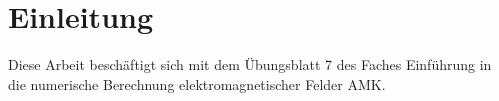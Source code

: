 \chapter{Einleitung}\label{sec:intro}
Diese Arbeit beschäftigt sich mit dem Übungsblatt 7 des Faches \glqq Einführung in die numerische Berechnung elektromagnetischer Felder\grqq{} AMK.